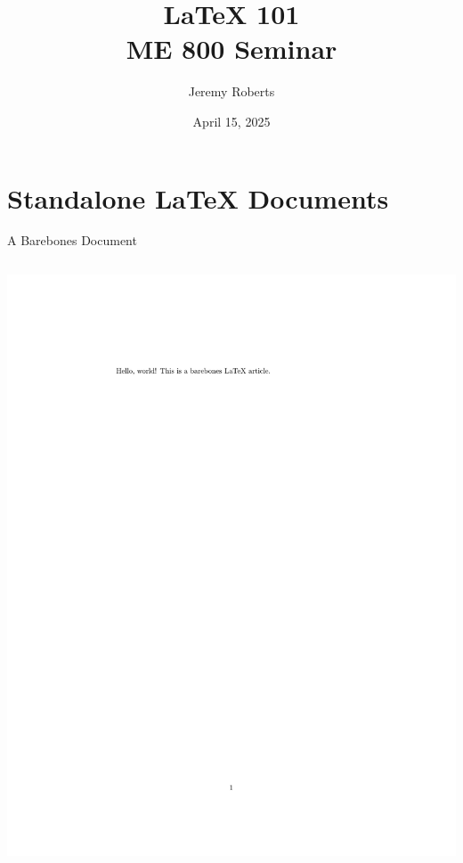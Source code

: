 \documentclass[aspectratio=1610]{beamer}
\title{\LaTeX{} 101 \\ {\small ME 800 Seminar}}
\date{April 15, 2025}
\author{Jeremy Roberts}
\begin{document}
\begin{frame}
  \titlepage
\end{frame}

\section{Standalone \LaTeX{} Documents}

\begin{frame}[fragile]{A Barebones Document}
  \begin{columns}[T]


      

      \vspace{0.25cm}


      \vspace{0.25cm}

      \includegraphics[width=1.01\textwidth, trim={5cm 22cm 8cm 3cm},
                       clip, frame]{example_article.pdf}



\end{columns}
\end{frame}
\end{document}

